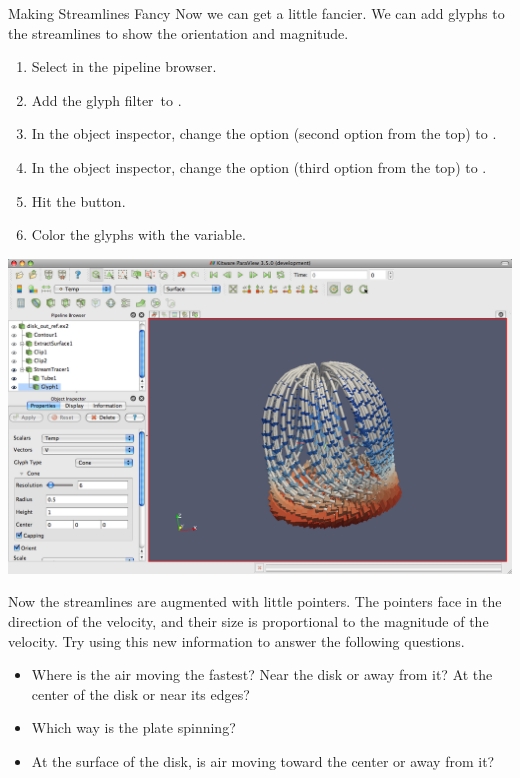 \begin{exercise}{Making Streamlines Fancy}
  Now we can get a little fancier.  We can add glyphs to the streamlines to
  show the orientation and magnitude.

  \begin{enumerate}
    \restorecounter
  \item Select  in the pipeline browser.
  \item Add the glyph filter~\glyph to .
  \item In the object inspector, change the  option (second
    option from the top) to .
  \item In the object inspector, change the  option (third
    option from the top) to .
  \item Hit the \apply button.
  \item Color the glyphs with the  variable.
  \end{enumerate}

  \begin{inlinefig}
    \includegraphics[width=\scw]{images/StreamTracer2}
  \end{inlinefig}

  Now the streamlines are augmented with little pointers.  The pointers
  face in the direction of the velocity, and their size is proportional to
  the magnitude of the velocity.  Try using this new information to answer
  the following questions.

  \begin{itemize}
  \item Where is the air moving the fastest?  Near the disk or away from it?
    At the center of the disk or near its edges?
  \item Which way is the plate spinning?
  \item At the surface of the disk, is air moving toward the center or away
    from it?
  \end{itemize}
\end{exercise}


